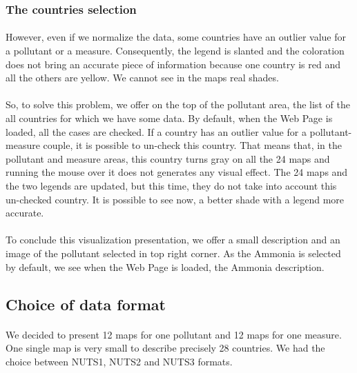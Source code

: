\documentclass[preprint,journal]{vgtc}       %
\begin{document}
\subsubsection{The countries selection}
\paragraph{}
However, even if we normalize the data, some countries have an outlier value for a pollutant or a measure. Consequently, the legend is slanted and the coloration does not bring an accurate piece of information because one country is red and all the others are yellow. We cannot see in the maps real shades. 
\paragraph{}
So, to solve this problem, we offer on the top of the pollutant area, the list of the all countries for which we have some data. By default, when the Web Page is loaded, all the cases are checked. If a country has an outlier value for a pollutant-measure couple, it is possible to un-check this country. 
\newline
That means that, in the pollutant and measure areas, this country turns gray on all the 24 maps and running the mouse over it does not generates any visual effect. The 24 maps and the two legends are updated, but this time, they do not take into account this un-checked country. It is possible to see now, a better shade with a legend more accurate.

\paragraph{}
To conclude this visualization presentation, we offer a small description and an image of the pollutant selected in top right corner. As the Ammonia is selected by default, we see when the Web Page is loaded, the Ammonia description.

\subsection{Choice of data format}
	\paragraph{}
We decided to present 12 maps for one pollutant and 12 maps for one measure. One single map is very small to describe precisely 28 countries. We had the choice between NUTS1, NUTS2 and NUTS3 formats.
\end{document}
